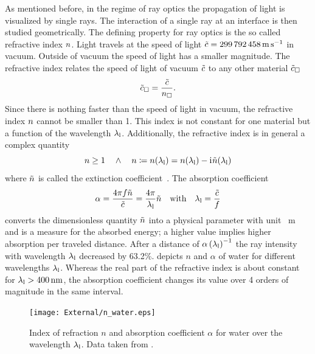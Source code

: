 As mentioned before, in the regime of ray optics the propagation of light is 
visualized by single rays. The interaction of a single ray at an interface is 
then studied geometrically. The defining property for ray optics is the so 
called refractive index $n$. Light travels at the speed of light 
$\tilde{\speed}=\SI{299792458}{\m\per\s}$ in vacuum. Outside of vacuum the 
speed of light has a smaller magnitude. The refractive index relates the speed 
of light of vacuum $\tilde{c}$ to any other material 
$\tilde{c}_{\Box}$
\begin{equation}
  \tilde{c}_{\Box} = \frac{\tilde{c}}{n_{\Box}}.
  \label{eq:TO-lightspeed}
\end{equation}
Since there is nothing faster than the speed of light in vacuum, the refractive 
index $n$ cannot be smaller than 1. This index is not constant for 
one material but a function of the wavelength $\lambda_{\mathrm{l}}$. Additionally, the 
refractive index is in general a complex quantity
\begin{equation}
  n\geq 1 \quad \wedge \quad n \coloneqq 
  n(\lambda_{\mathrm{l}}) = n(\lambda_{\mathrm{l}}) - \mathrm{i}\mkern1mu \tilde{n}(\lambda_{\mathrm{l}})
  \label{eq:TO-refractive-index}
\end{equation}
where $\tilde{n}$ is called the extinction 
coefficient~\cite{Jackson2013}. The absorption coefficient~\cite{Hecht2017}
\begin{equation}
  \alpha = \frac{4\pi f \tilde{n}}{\tilde{c}} = 
  \frac{4\pi}{\lambda_{\mathrm{l}}}\tilde{n}\quad\text{with}\quad\lambda_{\mathrm{l}}=\frac{\tilde{c}}{f}
  \label{eq:TO-alpha}
\end{equation}
converts the dimensionless quantity $\tilde{n}$ into a physical 
parameter with unit \si{\per\meter} and is a measure for the absorbed energy; a 
higher value implies higher absorption per traveled distance. After a distance 
of $\alpha\left(\lambda_{\mathrm{l}}\right)^{-1}$ the ray intensity with wavelength $\lambda_{\mathrm{l}}$ 
decreased by 63.2\%.  depicts $n$ and $\alpha$ of water 
for different wavelengths $\lambda_{\mathrm{l}}$. Whereas the real part of the refractive index 
is about constant for $\lal > \SI{400}{\nm}$, the absorption coefficient 
changes its value over 4 orders of magnitude in the same interval.

\begin{figure}[tbp]
  \centering
  \texttt{[image: External/n\_water.eps]}
  \caption{Index of refraction $n$ and absorption coefficient $\alpha$ for 
  water over the wavelength $\lambda_{\mathrm{l}}$. Data taken from 
\cite{Hale1973,Segelstein1981}.}
  \label{fig:TO-n_water}
\end{figure}


